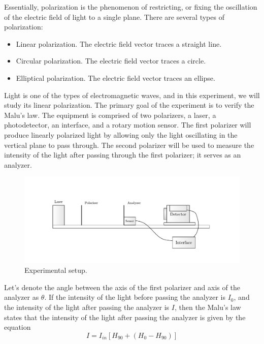\documentclass[10pt]{article}
\begin{document}
Essentially, polarization is the phenomenon of restricting, or fixing the oscillation of the electric field of light to a single plane. There are several types of polarization:
\begin{itemize}
  \item Linear polarization. The electric field vector traces a straight line.
  \item Circular polarization. The electric field vector traces a circle.
  \item Elliptical polarization. The electric field vector traces an ellipse.
\end{itemize}

Light is one of the types of electromagnetic waves, and in this experiment, we will study its linear polarization. The primary goal of the experiment is to verify the Malu's law. The equipment is comprised of two polarizers, a laser, a photodetector, an interface, and a rotary motion sensor. The first polarizer will produce linearly polarized light by allowing only the light oscillating in the vertical plane to pass through. The second polarizer will be used to measure the intensity of the light after passing through the first polarizer; it serves as an analyzer.

\begin{figure}[ht]
  \centering
  \includegraphics[scale=0.6]{figures/f1.pdf}
  \caption{Experimental setup.}
  \label{fig:1}
\end{figure}

Let's denote the angle between the axis of the first polarizer and axis of the analyzer as $\theta$. If the intensity of the light before passing the analyzer is $I_0$, and the intensity of the light after passing the analyzer is $I$, then the Malu's law states that the intensity of the light after passing the analyzer is given by the equation\cite[]{Hecht_2017}
\begin{equation}
  I = I_{in}\left[H_{90}+\left(H_0-H_{90}\right)\right]
  \label{eq:1}
\end{equation}
\end{document}

